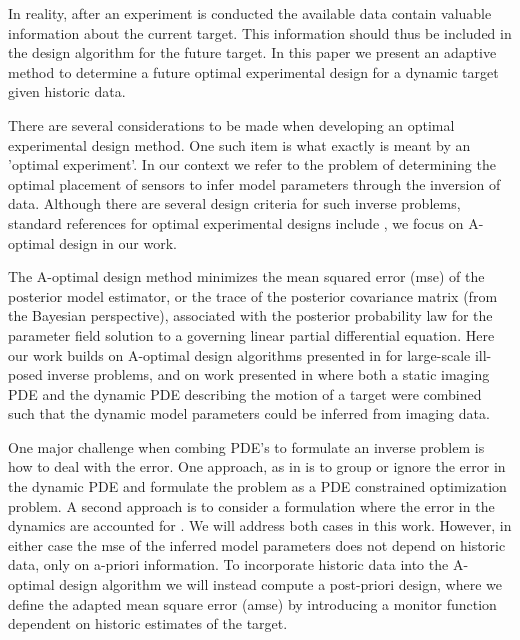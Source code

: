 \documentclass[11pt]{article}
\begin{document}
 In reality, after an experiment is conducted the available data contain valuable information about the current target. This information should thus be included in the design algorithm for the future target. In this paper we present an adaptive method to determine a future optimal experimental design for a dynamic target given historic data.
 
There are several considerations to be made when developing an optimal experimental design method. One such item is what exactly is meant by an 'optimal experiment'. In our context we refer to the problem of determining  the optimal placement of sensors to infer model parameters  through the inversion of  data. 
 Although there are several design criteria for such inverse problems, standard references for optimal experimental designs include \cite{Ajo-Franklin2009,Atkinson1992,Bardow2008}, we focus on A-optimal design in our work. 
 
 The A-optimal design method minimizes the mean squared error (mse) of the posterior model estimator, or the trace of the posterior covariance matrix (from the Bayesian perspective), associated with the posterior probability law for the parameter field solution to a governing linear partial differential equation. Here our work builds on A-optimal design algorithms presented in \cite{Haber2011} for large-scale ill-posed inverse problems, and on work presented in \cite{Fohring2014} where both a static imaging PDE and the dynamic PDE describing the motion of a target were combined such that the dynamic model parameters could be inferred from imaging data. 

One major challenge when combing PDE's to formulate an inverse problem is how to deal with the error. One approach, as in \cite{Fohring2014} is to group or ignore the error in the dynamic PDE and formulate the problem as a PDE constrained optimization problem. A second approach is to consider a formulation where the error in the dynamics are accounted for  \cite{Aravkin2010}. We will address both cases in this work. However, in either case the mse of the inferred model parameters does not depend on historic data, only on a-priori information. To incorporate historic data into the A-optimal design algorithm we will instead compute a post-priori design, where we define the adapted mean square error  (amse) by introducing a monitor function dependent on historic estimates of the  target. 
\end{document}
